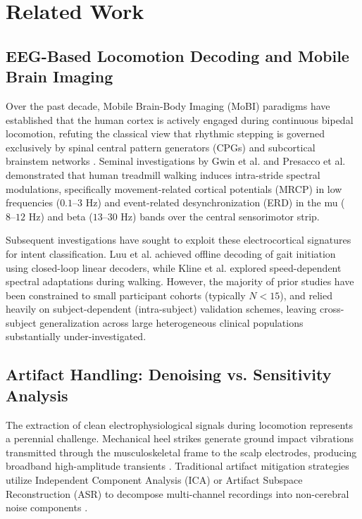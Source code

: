 \documentclass[review,12pt]{elsarticle}
\begin{document}
\section{Related Work}
\label{sec:related_work}

\subsection{EEG-Based Locomotion Decoding and Mobile Brain Imaging}
Over the past decade, Mobile Brain-Body Imaging (MoBI) paradigms have established that the human cortex is actively engaged during continuous bipedal locomotion, refuting the classical view that rhythmic stepping is governed exclusively by spinal central pattern generators (CPGs) and subcortical brainstem networks \cite{makeig2009mobi, gwin2011electrocortical}. Seminal investigations by Gwin et al. \cite{gwin2011electrocortical} and Presacco et al. \cite{presacco2011decoding} demonstrated that human treadmill walking induces intra-stride spectral modulations, specifically movement-related cortical potentials (MRCP) in low frequencies ($0.1\text{--}3\text{ Hz}$) and event-related desynchronization (ERD) in the mu ($8\text{--}12\text{ Hz}$) and beta ($13\text{--}30\text{ Hz}$) bands over the central sensorimotor strip.

Subsequent investigations have sought to exploit these electrocortical signatures for intent classification. Luu et al. \cite{luu2017gait} achieved offline decoding of gait initiation using closed-loop linear decoders, while Kline et al. \cite{kline2015locomotion} explored speed-dependent spectral adaptations during walking. However, the majority of prior studies have been constrained to small participant cohorts (typically $N < 15$), and relied heavily on subject-dependent (intra-subject) validation schemes, leaving cross-subject generalization across large heterogeneous clinical populations substantially under-investigated.

\subsection{Artifact Handling: Denoising vs. Sensitivity Analysis}
The extraction of clean electrophysiological signals during locomotion represents a perennial challenge. Mechanical heel strikes generate ground impact vibrations transmitted through the musculoskeletal frame to the scalp electrodes, producing broadband high-amplitude transients \cite{castermans2014accidental, snyder2015independent}. Traditional artifact mitigation strategies utilize Independent Component Analysis (ICA) or Artifact Subspace Reconstruction (ASR) to decompose multi-channel recordings into non-cerebral noise components \cite{mullen2015realtime, chang2018evaluation}.
\end{document}
